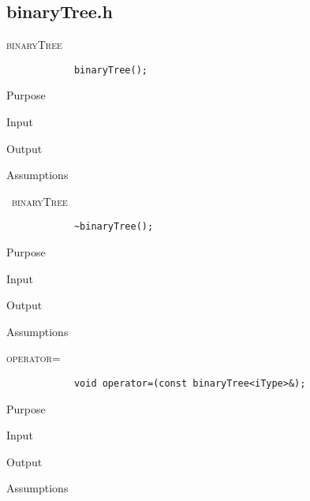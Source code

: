\documentclass[pdftex, 12pt]{article}
\begin{document}
\subsection{binaryTree.h}
\begin{description}

	\item{\textsc{binaryTree}}
		\begin{lstlisting}
			binaryTree();
		\end{lstlisting}
		\begin{description}

			\item{Purpose}

			\item{Input}

			\item{Output}

			\item{Assumptions}

		\end{description}
	\item{\textsc{~binaryTree}}
		\begin{lstlisting}
			~binaryTree();
		\end{lstlisting}
		\begin{description}

			\item{Purpose}

			\item{Input}

			\item{Output}

			\item{Assumptions}

		\end{description}
	\item{\textsc{operator=}}
		\begin{lstlisting}
			void operator=(const binaryTree<iType>&);
		\end{lstlisting}

		\begin{description}

			\item{Purpose}

			\item{Input}

			\item{Output}

			\item{Assumptions}

		\end{description}


\end{description}
\end{document}
